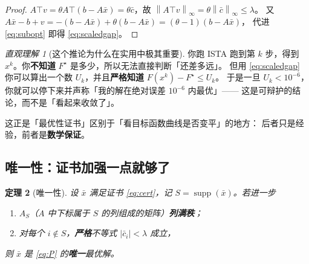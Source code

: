 \documentclass[11pt,a4paper,UTF8]{ctexart}
\theoremstyle{plain}
\newtheorem{theorem}{定理}[section]
\theoremstyle{definition}
\theoremstyle{remark}
\newtheorem{intuition}[theorem]{直观理解}
\newcommand{\norm}[1]{\left\lVert #1 \right\rVert}
\newcommand{\abs}[1]{\left\lvert #1 \right\rvert}
\newcommand{\supp}{\operatorname{supp}}
\begin{document}
\begin{proof}
$A\top v=\theta A\top(b-A\bar x)=\theta\bar c$，故 $\norm{A\top v}_\infty=\theta\norm{\bar c}_\infty\le\lambda$。
又
$A\bar x-b+v=-(b-A\bar x)+\theta(b-A\bar x)=(\theta-1)(b-A\bar x)$，
代进 \eqref{eq:subopt} 即得 \eqref{eq:scaledgap}。
\end{proof}

\begin{intuition}[这个推论为什么在实用中极其重要]
你跑 ISTA 跑到第 $k$ 步，得到 $x^k$。你\textbf{不知道} $F^\star$ 是多少，所以无法直接判断「还差多远」。
但用 \eqref{eq:scaledgap} 你可以算出一个数 $U_k$，并且\textbf{严格知道} $F(x^k)-F^\star\le U_k$。
于是一旦 $U_k<10^{-6}$，你就可以停下来并声称「我的解在绝对误差 $10^{-6}$ 内最优」——
这是可辩护的结论，而不是「看起来收敛了」。

这正是「最优性证书」区别于「看目标函数曲线是否变平」的地方：
后者只是经验，前者是\textbf{数学保证}。
\end{intuition}

\subsection{唯一性：证书加强一点就够了}

\begin{theorem}[唯一性]\label{thm:unique}
设 $\bar x$ 满足证书 \eqref{eq:cert}，记 $S=\supp(\bar x)$。若进一步
\begin{enumerate}
\item[(a)] $A_S$（$A$ 中下标属于 $S$ 的列组成的矩阵）\textbf{列满秩}；
\item[(b)] 对每个 $i\notin S$，\textbf{严格}不等式 $\abs{\bar c_i}<\lambda$ 成立，
\end{enumerate}
则 $\bar x$ 是 \eqref{eq:P} 的\textbf{唯一}最优解。
\end{theorem}
\end{document}
